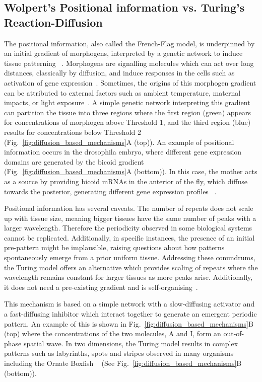 \subsection{Wolpert's Positional information vs. Turing's Reaction-Diffusion}
The positional information, also called the French-Flag model, is underpinned by an initial gradient of morphogens, interpreted by a genetic network to induce tissue patterning ~\parencite{Wolpert1969}.
Morphogens are signalling molecules which can act over long distances, classically by diffusion, and induce responses in the cells such as activation of gene expression~\parencite{rogers2011morphogen}.
Sometimes, the origins of this morphogen gradient can be attributed to external factors such as ambient temperature, maternal impacts, or light exposure~\parencite{Schier2009}.
A simple genetic network interpreting this gradient can partition the tissue into three regions where the first region (green) appears for concentrations of morphogen above Threshold 1, and the third region (blue) results for concentrations below Threshold 2 (Fig.~\ref{fig:diffusion_based_mechanisms}A (top)).
An example of positional information occurs in the drosophila embryo, where different gene expression domains are generated by the bicoid gradient (Fig.~\ref{fig:diffusion_based_mechanisms}A (bottom)).
In this case, the mother acts as a source by providing bicoid mRNAs in the anterior of the fly, which diffuse towards the posterior, generating different gene expression profiles ~\parencite{grimm2010modelling}.

Positional information has several caveats.
The number of repeats does not scale up with tissue size, meaning bigger tissues have the same number of peaks with a larger wavelength.
Therefore the periodicity observed in some biological systems cannot be replicated.
Additionally, in specific instances, the presence of an initial pre-pattern might be implausible, raising questions about how patterns spontaneously emerge from a prior uniform tissue.
Addressing these conundrums, the Turing model offers an alternative which provides scaling of repeats where the wavelength remains constant for larger tissues as more peaks arise.
Additionally, it does not need a pre-existing gradient and is self-organising~\parencite{Turing1952, Kondo2010a}.

This mechanism is based on a simple network with a slow-diffusing activator and a fast-diffusing inhibitor which interact together to generate an emergent periodic pattern.
An example of this is shown in Fig.~\ref{fig:diffusion_based_mechanisms}B (top) where the concentrations of the two molecules, A and I, form an out-of-phase spatial wave.
In two dimensions, the Turing model results in complex patterns such as labyrinths, spots and stripes observed in many organisms including the Ornate Boxfish ~\parencite{Alessio2023} (See Fig.~\ref{fig:diffusion_based_mechanisms}B (bottom)).

